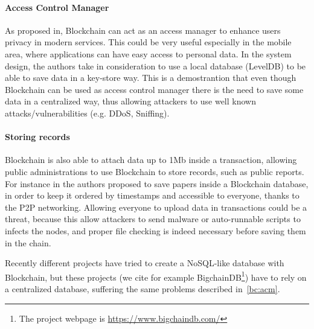\paragraph*{Access Control Manager}
\label{bc:acm}

As proposed in\cite{dp15}, Blockchain can act as an access manager to enhance
users privacy in modern services. This could be very useful especially in the
mobile area, where applications can have easy access to personal data. In the
system design, the authors take in consideration to use a local database
(LevelDB) to be able to save data in a key-store way. This is a demostrantion
that even though Blockchain can be used as access control manager there is the
need to save some data in a centralized way, thus allowing attackers to use
well known attacks/vulnerabilities (e.g. DDoS, Sniffing).

\paragraph*{Storing records}

Blockchain is also able to attach data up to 1Mb \cite{ectel16} inside a
transaction, allowing public administrations to use Blockchain to store
records, such as public reports. For instance in\cite{ectel16} the authors
proposed to save papers inside a Blockchain database, in order to keep it
ordered by timestamps and accessible to everyone, thanks to the P2P networking.
Allowing everyone to upload data in transactions could be a threat, because this
allow attackers to send malware or auto-runnable scripts to infects the nodes,
and proper file checking is indeed necessary before saving them in the chain.


Recently different projects have tried to create a NoSQL-like database with
Blockchain, but these projects (we cite for example BigchainDB\footnote{The
project webpage is \url{https://www.bigchaindb.com/}}) have to rely on a
centralized database, suffering the same problems described in~\ref{bc:acm}.
